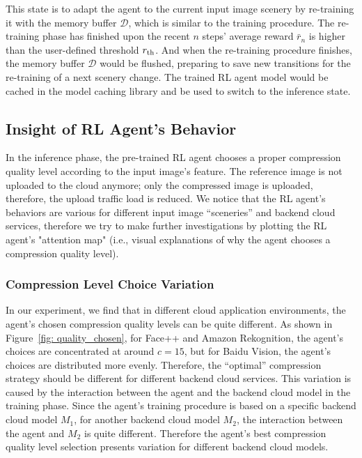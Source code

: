 This state is to adapt the agent to the current input image scenery by re-training it with the memory buffer $ \mathcal{D} $, which is similar to the training procedure. The re-training phase has finished upon the recent $ n $ steps' average reward $ \bar{r}_n $ is higher than the user-defined threshold $ r_{\rm th} $. And when the re-training procedure finishes, the memory buffer $ \mathcal{D} $ would be flushed, preparing to save new transitions for the re-training of a next scenery change. The trained RL agent model would be cached in the model caching library and be used to switch to the inference state.

\subsection{Insight of RL Agent's Behavior}
\label{subsec:insight}

In the inference phase, the pre-trained RL agent chooses a proper compression quality level according to the input image's feature. The reference image is not uploaded to the cloud anymore; only the compressed image is uploaded, therefore, the upload traffic load is reduced. We notice that the RL agent's behaviors are various for different input image ``sceneries'' and backend cloud services, therefore we try to make further investigations by plotting the RL agent's "attention map" (i.e., visual explanations of why the agent chooses a compression quality level). %

\subsubsection{\textbf{Compression Level Choice Variation}}

In our experiment, we find that in different cloud application environments, the agent's chosen compression quality levels can be quite different. As shown in Figure~\ref{fig: quality_chosen}, for Face++ and Amazon Rekognition, the agent's choices are concentrated at around $ c=15 $, but for Baidu Vision, the agent's choices are distributed more evenly. Therefore, the ``optimal'' compression strategy should be different for different backend cloud services. This variation is caused by the interaction between the agent and the backend cloud model in the training phase. Since the agent's training procedure is based on a specific backend cloud model $ M_1 $, for another backend cloud model $ M_2 $, the interaction between the agent and $ M_2 $ is quite different. Therefore the agent's best compression quality level selection presents variation for different backend cloud models.  

